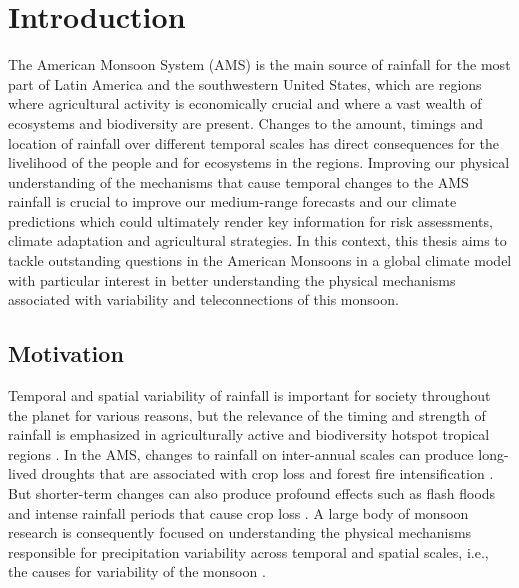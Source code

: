 

\chapter{\label{ch:1-intro}Introduction} 




The American Monsoon System (AMS) is the main source of rainfall for the most part of Latin America and the southwestern United States, which are regions where agricultural activity is economically crucial and where a vast wealth of ecosystems and biodiversity are present. Changes to the amount, timings and location of rainfall over different temporal scales has direct consequences for the livelihood of the people and for ecosystems in the regions. Improving our physical understanding of the mechanisms that cause temporal changes to the AMS rainfall is crucial to improve our medium-range forecasts and our climate predictions which could ultimately render key information for risk assessments, climate adaptation and agricultural strategies. In this context, this thesis aims to tackle outstanding questions in the American Monsoons in a global climate model with particular interest in better understanding the physical mechanisms associated with variability and teleconnections of this monsoon.



\section{Motivation}

Temporal and spatial variability of rainfall is important for society throughout the planet for various reasons, but the relevance of the timing and strength of rainfall is emphasized in agriculturally active and biodiversity hotspot tropical regions \citep{sultan2005,jain2015}. 
In the AMS, changes to rainfall on inter-annual scales can produce long-lived droughts that are associated with crop loss and forest fire intensification \citep{chen2009,harvey2018}. But shorter-term changes can also produce profound effects such as flash floods and intense rainfall periods that cause crop loss \citep{devereux2007,avila2016recent}.
A large body of monsoon research is consequently focused on understanding the physical mechanisms responsible for precipitation variability across temporal and spatial scales, i.e., the causes for variability of the monsoon \citep{wang2017,gadgil2018}. 

